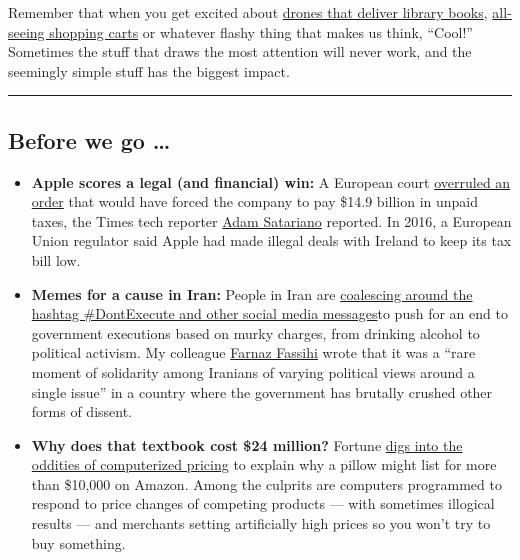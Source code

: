 Remember that when you get excited about
\href{https://www.nytimes3xbfgragh.onion/2020/06/17/us/google-wing-drones-virginia-books.html}{drones
that deliver library books},
\href{https://arstechnica.com/information-technology/2020/07/amazon-supermarket-will-roll-out-fancy-new-smart-cart-when-it-opens/}{all-seeing
shopping carts} or whatever flashy thing that makes us think, ``Cool!''
Sometimes the stuff that draws the most attention will never work, and
the seemingly simple stuff has the biggest impact.

\begin{center}\rule{0.5\linewidth}{\linethickness}\end{center}

\hypertarget{before-we-go-}{%
\subsection{Before we go \ldots{}}\label{before-we-go-}}

\begin{itemize}
\item
  \textbf{Apple scores a legal (and financial) win:} A European court
  \href{https://www.nytimes3xbfgragh.onion/2020/07/15/business/apple-eu-ireland-tax.html}{overruled
  an order} that would have forced the company to pay \$14.9 billion in
  unpaid taxes, the Times tech reporter
  \href{https://www.nytimes3xbfgragh.onion/by/adam-satariano}{Adam
  Satariano} reported. In 2016, a European Union regulator said Apple
  had made illegal deals with Ireland to keep its tax bill low.
\item
  \textbf{Memes for a cause in Iran:} People in Iran are
  \href{https://www.nytimes3xbfgragh.onion/2020/07/15/world/middleeast/iran-protests-capital-punishment.html}{coalescing
  around the hashtag \#DontExecute and other social media messages}to
  push for an end to government executions based on murky charges, from
  drinking alcohol to political activism. My colleague
  \href{https://www.nytimes3xbfgragh.onion/by/farnaz-fassihi}{Farnaz
  Fassihi} wrote that it was a ``rare moment of solidarity among
  Iranians of varying political views around a single issue'' in a
  country where the government has brutally crushed other forms of
  dissent.
\item
  \textbf{Why does that textbook cost \$24 million?} Fortune
  \href{https://fortune.com/2020/07/14/wayfair-cabinet-conspiracy-algorithm-amazon-pricing-ecommerce/}{digs
  into the oddities of computerized pricing} to explain why a pillow
  might list for more than \$10,000 on Amazon. Among the culprits are
  computers programmed to respond to price changes of competing products
  --- with sometimes illogical results --- and merchants setting
  artificially high prices so you won't try to buy something.
\end{itemize}

